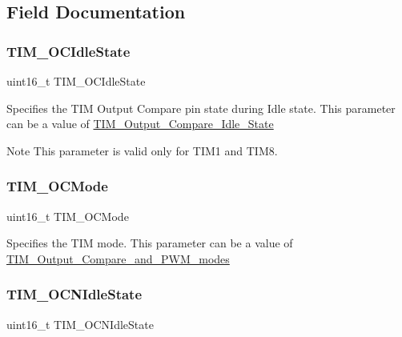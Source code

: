 \subsection{Field Documentation}
\mbox{\label{struct_t_i_m___o_c_init_type_def_afb328e9ef4de6eb9d78390d7366b9a6e}} 
\subsubsection{\texorpdfstring{TIM\_OCIdleState}{TIM\_OCIdleState}}
{\footnotesize\ttfamily uint16\+\_\+t T\+I\+M\+\_\+\+O\+C\+Idle\+State}

Specifies the T\+IM Output Compare pin state during Idle state. This parameter can be a value of \mbox{\hyperlink{group___t_i_m___output___compare___idle___state}{T\+I\+M\+\_\+\+Output\+\_\+\+Compare\+\_\+\+Idle\+\_\+\+State}} \begin{DoxyNote}{Note}
This parameter is valid only for T\+I\+M1 and T\+I\+M8. 
\end{DoxyNote}
\mbox{\label{struct_t_i_m___o_c_init_type_def_afa69e616eb0b11bd238062dd8a5ceaa5}} 
\subsubsection{\texorpdfstring{TIM\_OCMode}{TIM\_OCMode}}
{\footnotesize\ttfamily uint16\+\_\+t T\+I\+M\+\_\+\+O\+C\+Mode}

Specifies the T\+IM mode. This parameter can be a value of \mbox{\hyperlink{group___t_i_m___output___compare__and___p_w_m__modes}{T\+I\+M\+\_\+\+Output\+\_\+\+Compare\+\_\+and\+\_\+\+P\+W\+M\+\_\+modes}} \mbox{\label{struct_t_i_m___o_c_init_type_def_a68f0241aa8d57bb42cd8e56c153f8e48}} 
\subsubsection{\texorpdfstring{TIM\_OCNIdleState}{TIM\_OCNIdleState}}
{\footnotesize\ttfamily uint16\+\_\+t T\+I\+M\+\_\+\+O\+C\+N\+Idle\+State}

